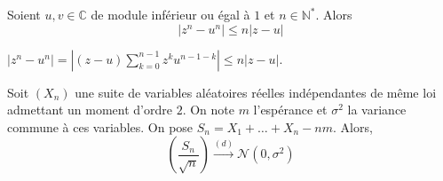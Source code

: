 	
	\begin{lemma}
		\label{theoreme-central-limite-2}
		Soient $u, v \in \mathbb{C}$ de module inférieur ou égal à $1$ et $n \in \mathbb{N}^*$. Alors
		\[ |z^n - u^n| \leq n |z-u| \]
	\end{lemma}
	
	\begin{demonstration}
		$|z^n - u^n| = |(z-u) \sum_{k=0}^{n-1} z^k u^{n-1-k}| \leq n |z-u|$.
	\end{demonstration}

	\begin{theorem}
		Soit $(X_n)$ une suite de variables aléatoires réelles indépendantes de même loi admettant un moment d'ordre $2$. On note $m$ l'espérance et $\sigma^2$ la variance commune à ces variables. On pose $S_n = X_1 + \dots + X_n - nm$. Alors,
		\[ \left ( \frac{S_n}{\sqrt{n}} \right) \overset{(d)}{\longrightarrow} \mathcal{N}(0, \sigma^2) \]
	\end{theorem}
	
